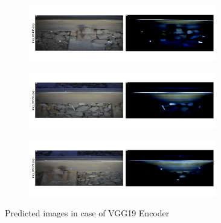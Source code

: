 \begin{figure}[!ht]
    \centering
    \begin{subfigure}{\textwidth}
        \centering
        \includegraphics[width=0.9\textwidth,trim={0 1cm 0 1cm},clip]{./results/vgg19_vgg19/20230510_172958_predict_0.png}
    \end{subfigure}
    \begin{subfigure}{\textwidth}
        \centering
        \includegraphics[width=0.9\textwidth,trim={0 1cm 0 1cm},clip]{./results/vgg19_vgg19/20230510_172958_predict_1.png}
    \end{subfigure}
    \begin{subfigure}{\textwidth}
        \centering
        \includegraphics[width=0.9\textwidth,trim={0 1cm 0 1cm},clip]{./results/vgg19_vgg19/20230510_172958_predict_2.png}
    \end{subfigure}
    \caption{Predicted images in case of VGG19 Encoder}
    \label{fig:vgg19_examples}
\end{figure}

